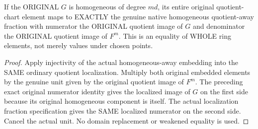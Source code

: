 \begin{corollary}
\label{projective:actual-admissible-native-homogeneous-fraction}
\leanok
{}
If the ORIGINAL $G$ is homogeneous of degree $md$, its entire original
quotient-chart element maps to EXACTLY the genuine native homogeneous
quotient-away fraction with numerator the ORIGINAL quotient image of
$G$ and denominator the ORIGINAL quotient image of $F^m$. This is an
equality of WHOLE ring elements, not merely values under chosen points.
\end{corollary}
\begin{proof}
Apply injectivity of the actual homogeneous-away embedding into the
SAME ordinary quotient localization. Multiply both original embedded
elements by the genuine unit given by the original quotient image of
$F^m$. The preceding exact original numerator identity gives the
localized image of $G$ on the first side because its original homogeneous
component is itself. The actual localization fraction specification gives
the SAME localized numerator on the second side. Cancel the actual unit.
No domain replacement or weakened equality is used.
\end{proof}
